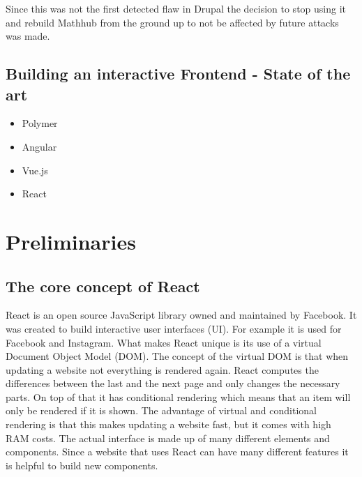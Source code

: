 \documentclass[11pt,a4paper]{article}
\begin{document}
Since this was not the first detected flaw in Drupal the decision to stop using it and rebuild Mathhub from the ground up to not be affected by future attacks was made.

	\subsection{Building an interactive Frontend - State of the art}
	\begin{itemize}
	\item Polymer
	\item Angular
	\item Vue.js
	\item React
	\end{itemize}

\section{Preliminaries}
	\subsection{The core concept of React} 
	React is an open source JavaScript library owned and maintained by Facebook.	It was created to build interactive user interfaces (UI). For example it is used for Facebook and Instagram. What makes React unique is its use of a virtual Document Object Model (DOM). The concept of the virtual DOM is that when updating a website not everything is rendered again. React computes the differences between the last and the next page and only changes the necessary parts. On top of that it has conditional rendering which means that an item will only be rendered if it is shown. The advantage of virtual and conditional rendering is that this makes updating a website fast, but it comes with high RAM costs. The actual interface is made up of many different elements and components. Since a website that uses React can have many different features it is helpful to build new components. 
\cite{reactjs}
	
	
\end{document}
